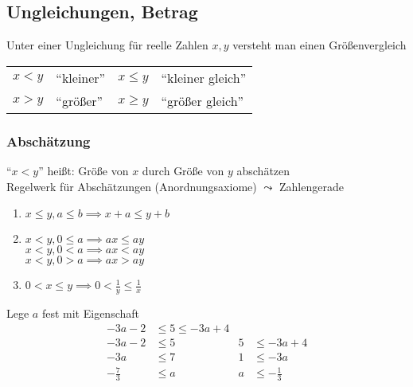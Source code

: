 
\subsection{Ungleichungen, Betrag}

\begin{definition}[Ungleichung]
Unter einer Ungleichung für reelle Zahlen $x,y$ versteht man einen Größenvergleich

  \begin{table}[h]
    \centering
    \begin{tabular}{|ll||ll|}
      \hline
      $x<y$ & "`kleiner"' & $x\leq y$ & "`kleiner gleich"' \\ 
      $x>y$ & "`größer"' & $x \geq y$ & "`größer gleich"' \\\hline
    \end{tabular}
  \end{table}
  
\end{definition}

\subsubsection*{Abschätzung}

"`$x<y$"' heißt: Größe von $x$ durch Größe von $y$ abschätzen\\
Regelwerk für Abschätzungen (Anordnungsaxiome) $\leadsto$ Zahlengerade

\begin{enumerate}
 \item $x \leq y, a\leq b \implies x+a \leq y+b$
 \item
  $x<y, 0 \leq a \implies ax \leq ay$\\ 
  $x<y, 0 < a \implies ax < ay$\\
  $x<y, 0 > a \implies ax > ay$
 \item $0<x\leq y \implies 0 < \frac{1}{y} \leq \frac{1}{x}$
\end{enumerate}

\begin{example}
Lege $a$ fest mit Eigenschaft
\begin{align*}
-3a-2        &\leq 5 \leq -3a+4  &&\\
-3a-2        &\leq 5 & 5 &\leq -3a+4 \\
-3a          &\leq 7 & 1 &\leq -3a \\
-\frac{7}{3} &\leq a & a &\leq -\frac{1}{3}
\end{align*}

\end{example}

